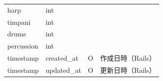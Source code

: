 \begin{table}[p]
\begin{tabularx}{\textwidth}{llcR}
        harp                   & int         &          &              \\
        timpani                & int         &          &              \\
        drums                  & int         &          &              \\
        percussion             & int         &          &              \\
        {{timestamp}}          & created\_at & O        & 作成日時（Rails）  \\
        {{timestamp}}          & updated\_at & O        & 更新日時（Rails）  \\
        \hline
    \end{tabularx}
    \label{tableDesgin2}
\end{table}